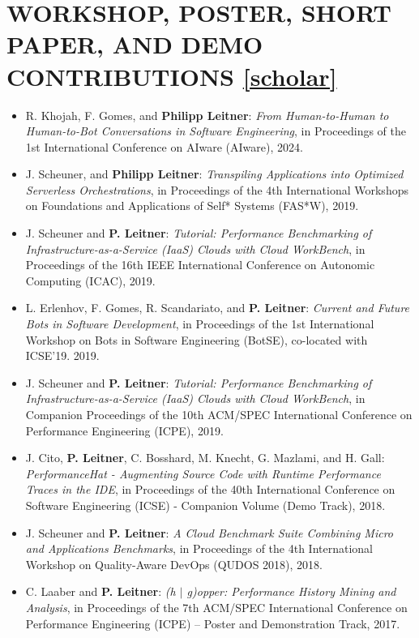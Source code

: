 \documentclass[paper=letter,fontsize=11pt]{scrartcl} %
\newcommand{\NewPart}[2]{\section*{\uppercase{#1} #2}}
\begin{document}
\NewPart{Workshop, Poster, Short Paper, and Demo Contributions}{\href{https://scholar.google.ch/citations?user=wZ9f8CAAAAAJ}{[scholar]}}

\begin{itemize}
	\item R. Khojah, F. Gomes, and \textbf{Philipp Leitner}:
\emph{From Human-to-Human to Human-to-Bot Conversations in Software
Engineering}, in Proceedings of the 1st International Conference on AIware (AIware), 2024.  
	\item J. Scheuner, and \textbf{Philipp Leitner}:
\emph{Transpiling Applications into Optimized Serverless Orchestrations}, in Proceedings of the 4th International Workshops on Foundations and Applications of Self* Systems (FAS*W), 2019. 
	\item J. Scheuner and \textbf{P. Leitner}: \emph{Tutorial: Performance Benchmarking of Infrastructure-as-a-Service (IaaS) Clouds with Cloud WorkBench}, in Proceedings of the 16th IEEE International Conference on Autonomic Computing (ICAC), 2019.  
	\item L. Erlenhov, F. Gomes, R. Scandariato, and \textbf{P. Leitner}: \emph{Current and Future Bots in Software Development}, in Proceedings of the 1st International Workshop on
Bots in Software Engineering (BotSE), co-located with ICSE'19. 2019. 
	\item J. Scheuner and \textbf{P. Leitner}: \emph{Tutorial: Performance Benchmarking of Infrastructure-as-a-Service (IaaS) Clouds with Cloud WorkBench}, in Companion Proceedings of the 10th ACM/SPEC International Conference on Performance Engineering (ICPE), 2019. \\ 
	\item J. Cito, \textbf{P. Leitner}, C. Bosshard, M. Knecht, G. Mazlami, and H. Gall: \emph{PerformanceHat - Augmenting Source Code with Runtime Performance Traces in the IDE}, in Proceedings of the 40th International Conference on Software Engineering (ICSE) - Companion Volume (Demo Track), 2018. 
	\item J. Scheuner and \textbf{P. Leitner}: \emph{A Cloud Benchmark Suite Combining Micro and Applications Benchmarks}, in Proceedings of the 4th International Workshop on Quality-Aware DevOps (QUDOS 2018), 2018. 
	\item C. Laaber and \textbf{P. Leitner}: \emph{ (h $|$ g)opper: Performance History Mining and Analysis},  in Proceedings of the 7th ACM/SPEC International Conference on Performance Engineering (ICPE) -- Poster and Demonstration Track, 2017. 

\end{itemize}
\end{document}
